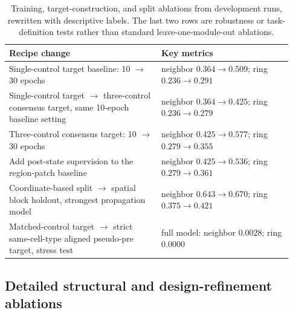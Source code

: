 \documentclass[sigconf,anonymous,review]{acmart}
\begin{document}
\begin{table}[t]
\centering
\caption{Training, target-construction, and split ablations from development runs, rewritten with descriptive labels. The last two rows are robustness or task-definition tests rather than standard leave-one-module-out ablations.}
\label{tab:app_ablation_recipe}
\small
\setlength{\tabcolsep}{8pt}
\renewcommand{\arraystretch}{1.14}
\begin{tabular}{@{}p{0.50\linewidth}p{0.43\linewidth}@{}}
\toprule
Recipe change & Key metrics \\
\midrule
Single-control target baseline: 10 $\rightarrow$ 30 epochs & neighbor $0.364\rightarrow0.509$; ring $0.236\rightarrow0.291$ \\
Single-control target $\rightarrow$ three-control consensus target, same 10-epoch baseline setting & neighbor $0.364\rightarrow0.425$; ring $0.236\rightarrow0.279$ \\
Three-control consensus target: 10 $\rightarrow$ 30 epochs & neighbor $0.425\rightarrow0.577$; ring $0.279\rightarrow0.355$ \\
Add post-state supervision to the region-patch baseline & neighbor $0.425\rightarrow0.536$; ring $0.279\rightarrow0.361$ \\
Coordinate-based split $\rightarrow$ spatial block holdout, strongest propagation model & neighbor $0.643\rightarrow0.670$; ring $0.375\rightarrow0.421$ \\
Matched-control target $\rightarrow$ strict same-cell-type aligned pseudo-pre target, stress test & full model: neighbor $0.0028$; ring $0.0000$ \\
\bottomrule
\end{tabular}
\end{table}

\subsection{Detailed structural and design-refinement ablations}
\label{app:structural_design_refinement}
\end{document}
